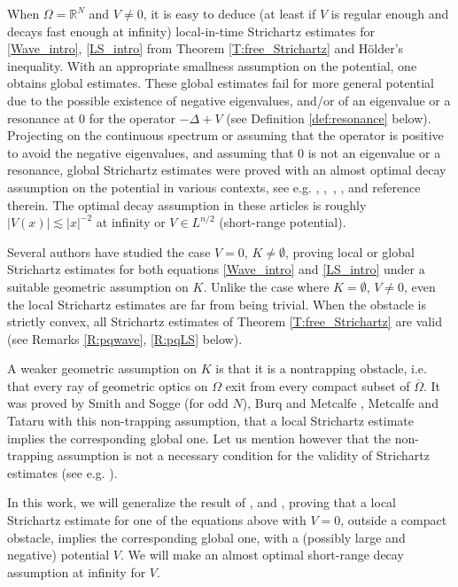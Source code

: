 \documentclass[10pt,leqno]{amsart}
\theoremstyle{definition}%
\theoremstyle{remark}
\numberwithin{equation}{section}
\newcommand{\R}{\mathbb{R}}
\renewcommand{\^}{\widehat}%
\begin{document}
When $\Omega=\R^N$ and $V\neq 0$, it is easy to deduce (at least if $V$ is regular enough and decays fast enough at infinity) local-in-time Strichartz estimates for \eqref{Wave_intro}, \eqref{LS_intro} from Theorem \ref{T:free_Strichartz} and H\"older's inequality. With an appropriate smallness assumption on the potential, one obtains global estimates. These global estimates fail for more general potential due to the possible existence of negative eigenvalues, and/or of an eigenvalue or a resonance at $0$ for the operator $-\Delta +V$ (see Definition \ref{def:resonance} below). Projecting on the continuous spectrum or assuming that the operator is positive to avoid the negative eigenvalues, and assuming that $0$ is not an eigenvalue or a resonance, global Strichartz estimates were proved with an almost optimal decay assumption on the potential in various contexts, see e.g. \cite{RodnianskiSchlag04},  \cite{MetcalfeTataru12}, \cite{Beceanu11}, \cite{BoucletMizutani18}, \cite{DAncona20} and reference therein. The optimal decay assumption in these articles is roughly $|V(x)|\lesssim |x|^{-2}$ at infinity or $V\in L^{n/2}$ (short-range potential).

Several authors have studied the case $V=0$, $K\neq \emptyset$, proving local or global Strichartz estimates for both equations \eqref{Wave_intro} and \eqref{LS_intro} under a suitable geometric assumption on $K$. Unlike the case where $K=\emptyset$, $V\neq 0$, even the local Strichartz estimates are far from being trivial. When the obstacle is strictly convex, all Strichartz estimates of Theorem \ref{T:free_Strichartz} are valid (see Remarks \ref{R:pqwave}, \ref{R:pqLS} below).


A weaker geometric assumption on $K$ is that it is a nontrapping obstacle, i.e. that every ray of geometric optics on $\Omega$ exit from every compact subset of $\overline{\Omega}$. It was proved by Smith and Sogge \cite{SmithSogge00} (for odd $N$), Burq \cite{Burq03} and Metcalfe \cite{Metcalfe04}, Metcalfe and Tataru \cite{MetcalfeTataru08}  with this non-trapping assumption, that a local Strichartz estimate implies the corresponding global one.
Let us mention however that the non-trapping assumption is not a necessary condition for the validity of Strichartz estimates (see e.g. \cite{Lafontaine22}).


In this work, we will generalize the result of \cite{SmithSogge00}, \cite{Burq03} and \cite{Metcalfe04},   proving that a local Strichartz estimate for one of the equations above with $V=0$, outside a compact obstacle, implies the corresponding global one, with a (possibly large and negative) potential $V$. We will make an almost optimal short-range decay assumption at infinity for $V$.
\end{document}
